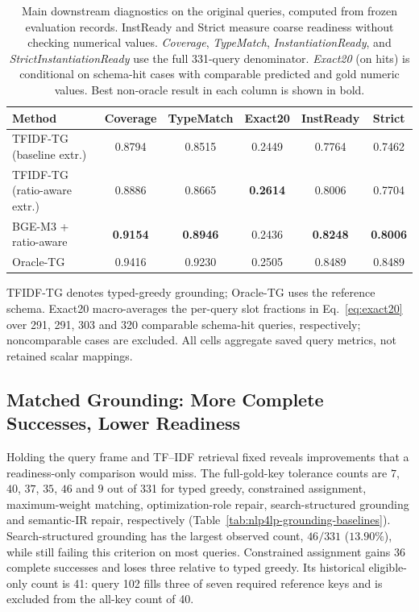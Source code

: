 \documentclass[pdflatex,iicol,sn-basic,Numbered]{sn-jnl}
\begin{document}
\begin{table}[t]
  \centering
  \renewcommand{\arraystretch}{1.18}
  \caption{Main downstream diagnostics on the original queries, computed from frozen evaluation records. InstReady and Strict measure coarse readiness without checking numerical values. \textit{Coverage}, \textit{TypeMatch}, \textit{InstantiationReady}, and \textit{StrictInstantiationReady} use the full 331-query denominator. \textit{Exact20} (on hits) is conditional on schema-hit cases with comparable predicted and gold numeric values. Best non-oracle result in each column is shown in bold.}
  \label{tab:nlp4lp-downstream-main}
  \small
  \setlength{\tabcolsep}{3.2pt}
  \renewcommand{\arraystretch}{1.12}
  \begin{tabular}{@{}lccccc@{}}
    \toprule
    Method & Coverage & TypeMatch & Exact20 & InstReady & Strict \\
    \midrule
TFIDF-TG (baseline extr.) & 0.8794 & 0.8515 & 0.2449 & 0.7764 & 0.7462 \\
TFIDF-TG (ratio-aware extr.) & 0.8886 & 0.8665 & \textbf{0.2614} & 0.8006 & 0.7704 \\
BGE-M3 + ratio-aware & \textbf{0.9154} & \textbf{0.8946} & 0.2436 & \textbf{0.8248} & \textbf{0.8006} \\
Oracle-TG & 0.9416 & 0.9230 & 0.2505 & 0.8489 & 0.8489 \\
    \bottomrule
  \end{tabular}

  \vspace{2mm}
  \raggedright
  \small
  TFIDF-TG denotes typed-greedy grounding; Oracle-TG uses the reference schema. Exact20 macro-averages the per-query slot fractions in Eq.~\eqref{eq:exact20} over 291, 291, 303 and 320 comparable schema-hit queries, respectively; noncomparable cases are excluded. All cells aggregate saved query metrics, not retained scalar mappings.
\end{table}
\subsection{Matched Grounding: More Complete Successes, Lower Readiness}
\label{subsec:exp_grounding_baselines}
Holding the query frame and TF--IDF retrieval fixed reveals improvements that a readiness-only comparison would miss. The full-gold-key tolerance counts are $7$, $40$, $37$, $35$, $46$ and $9$ out of 331 for typed greedy, constrained assignment, maximum-weight matching, optimization-role repair, search-structured grounding and semantic-IR repair, respectively (Table~\ref{tab:nlp4lp-grounding-baselines}). Search-structured grounding has the largest observed count, $46/331$ ($13.90\%$), while still failing this criterion on most queries. Constrained assignment gains 36 complete successes and loses three relative to typed greedy. Its historical eligible-only count is 41: query 102 fills three of seven required reference keys and is excluded from the all-key count of 40.
\end{document}
